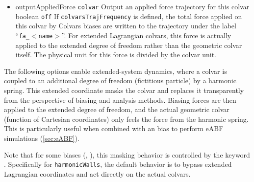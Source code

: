 \begin{itemize}
\item %
  \keydef
    {outputAppliedForce}{%
    \texttt{colvar}}{%
    Output an applied force trajectory for this
    colvar}{%
    boolean}{%
    \texttt{off}}{%
    If \texttt{colvarsTrajFrequency} is defined, the total force
    applied on this colvar by Colvars biases are
    written to the trajectory under the label
    ``\texttt{fa\_}$<$\texttt{name}$>$''.
    For extended Lagrangian colvars, this force is actually applied to the
    extended degree of freedom rather than the geometric colvar itself.
    The physical unit for this
    force is  divided by the colvar unit.}

\end{itemize}



The following options enable extended-system
dynamics, where a colvar is coupled to an additional degree of freedom
(fictitious particle) by a harmonic spring.
This extended coordinate masks the colvar and replaces it transparently from
the perspective of biasing and analysis methods.
Biasing forces are then applied to the extended degree
of freedom, and the actual geometric colvar (function of Cartesian
coordinates) only feels the force from the harmonic spring.
This is particularly useful when combined with an  bias
to perform eABF simulations (\ref{sec:eABF}).

Note that for some biases (, ),
this masking behavior is controlled by the keyword .
Specifically for \texttt{harmonicWalls}, the default behavior is to bypass extended Lagrangian
coordinates and act directly on the actual colvars.


